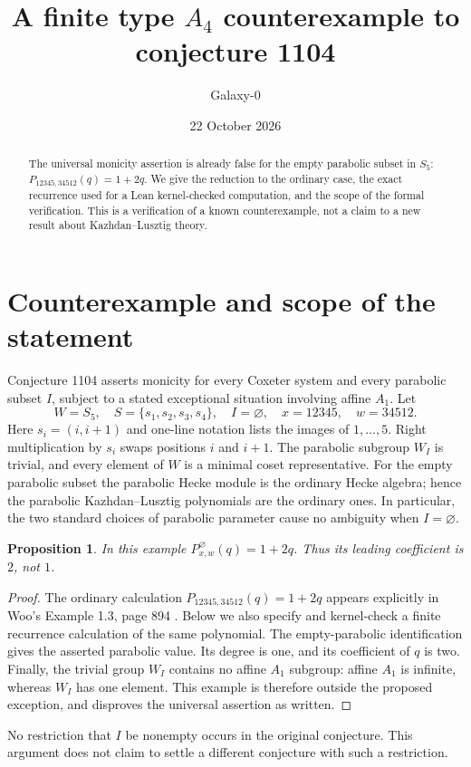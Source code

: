 \documentclass[11pt]{article}
\title{A finite type $A_4$ counterexample to conjecture 1104}
\author{Galaxy-0}
\date{22 October 2026}
\newtheorem{proposition}{Proposition}
\begin{document}
\maketitle
\begin{abstract}
The universal monicity assertion is already false for the empty parabolic subset in $S_5$: $P_{12345,34512}(q)=1+2q$. We give the reduction to the ordinary case, the exact recurrence used for a Lean kernel-checked computation, and the scope of the formal verification. This is a verification of a known counterexample, not a claim to a new result about Kazhdan--Lusztig theory.
\end{abstract}
\section{Counterexample and scope of the statement}
Conjecture 1104 asserts monicity for every Coxeter system and every parabolic subset $I$, subject to a stated exceptional situation involving affine $A_1$. Let
\[
 W=S_5,\quad S=\{s_1,s_2,s_3,s_4\},\quad I=\varnothing,
 \quad x=12345,\quad w=34512.
\]
Here $s_i=(i,i+1)$ and one-line notation lists the images of $1,\ldots,5$. Right multiplication by $s_i$ swaps positions $i$ and $i+1$. The parabolic subgroup $W_I$ is trivial, and every element of $W$ is a minimal coset representative. For the empty parabolic subset the parabolic Hecke module is the ordinary Hecke algebra; hence the parabolic Kazhdan--Lusztig polynomials are the ordinary ones. In particular, the two standard choices of parabolic parameter cause no ambiguity when $I=\varnothing$.

\begin{proposition}
In this example $P^\varnothing_{x,w}(q)=1+2q$. Thus its leading coefficient is $2$, not $1$.
\end{proposition}
\begin{proof}
The ordinary calculation $P_{12345,34512}(q)=1+2q$ appears explicitly in Woo's Example 1.3, page 894 \cite{woo}. Below we also specify and kernel-check a finite recurrence calculation of the same polynomial. The empty-parabolic identification gives the asserted parabolic value. Its degree is one, and its coefficient of $q$ is two. Finally, the trivial group $W_I$ contains no affine $A_1$ subgroup: affine $A_1$ is infinite, whereas $W_I$ has one element. This example is therefore outside the proposed exception, and disproves the universal assertion as written.
\end{proof}
No restriction that $I$ be nonempty occurs in the original conjecture. This argument does not claim to settle a different conjecture with such a restriction.
\end{document}
